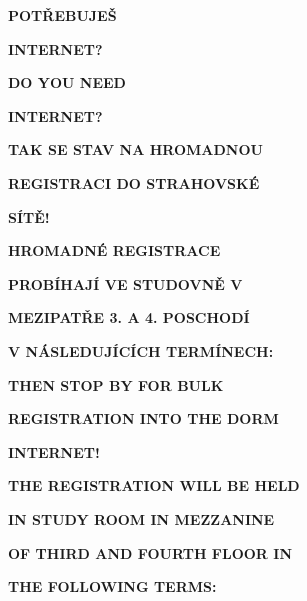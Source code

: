\documentclass[12pt,a4paper]{article}
\newcommand{\datumA}{24. 9. 2024}
\newcommand{\datumB}{3. 10. 2024}
\newcommand{\datumC}{10. 10. 2024}
\newcommand{\cas}{19:00}
\begin{document}
    {\fontsize{65pt}{78pt}\selectfont \textbf{POTŘEBUJEŠ}} 

    {\fontsize{65pt}{78pt}\selectfont \textbf{INTERNET?}}

    \vspace{1em}

    {\fontsize{40pt}{48pt}\selectfont \textbf{DO YOU NEED}}

    {\fontsize{40pt}{48pt}\selectfont \textbf{INTERNET?}}

    \vspace{2cm}

    \large
    \begin{minipage}[c]{0.45\textwidth}
        \textbf{TAK SE STAV NA HROMADNOU}

        \textbf{REGISTRACI DO STRAHOVSKÉ}

        \textbf{SÍTĚ!}

        \textbf{HROMADNÉ REGISTRACE}

        \textbf{PROBÍHAJÍ VE STUDOVNĚ V}

        \textbf{MEZIPATŘE 3. A 4. POSCHODÍ}

        \textbf{V NÁSLEDUJÍCÍCH TERMÍNECH:}
    \end{minipage}%
    \hspace{0.1\textwidth}%
    \begin{minipage}[c]{0.45\textwidth}
        \textbf{THEN STOP BY FOR BULK}

        \textbf{REGISTRATION INTO THE DORM}

        \textbf{INTERNET!}

        \textbf{THE REGISTRATION WILL BE HELD}

        \textbf{IN STUDY ROOM IN MEZZANINE}

        \textbf{OF THIRD AND FOURTH FLOOR IN}

        \textbf{THE FOLLOWING TERMS:}
    \end{minipage}

    \begin{center}
    \end{center}
\end{document}
